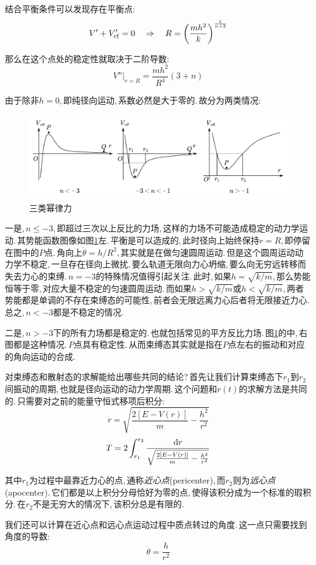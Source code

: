 结合平衡条件可以发现存在平衡点:
\[V'+V_{\rm cf}'=0\quad\Rightarrow \quad R=\left(\frac{mh^2}{k}\right)^{\frac{1}{n+3}}\]

那么在这个点处的稳定性就取决于二阶导数:
\[V''|_{r=R}=\frac{mh^2}{R^4}\left(3+n\right)\]

由于除非$h=0$,\,即纯径向运动,\,系数必然是大于零的.\,故分为两类情况:
\begin{figure}[H]
\centering
\includegraphics[width=16cm]{image/6-5-2.png}
\caption{三类幂律力}\label{6-5-2}
\end{figure}


一是,\,$n\leq -3$,\,即超过三次以上反比的力场,\,这样的力场不可能造成稳定的动力学运动.\,其势能函数图像如图\ref{6-5-2}左.\,平衡是可以造成的,\,此时径向上始终保持$r=R$,\,即停留在图中的$P$点.\,角向上$\dot{\theta}=h/R^2$,\,其实就是在做匀速圆周运动.\,但是这个圆周运动动力学不稳定,\,一旦存在径向上微扰,\,要么轨道无限向力心坍缩,\,要么向无穷远转移而失去力心的束缚.\,$n=-3$的特殊情况值得引起关注.\,此时,\,如果$h=\sqrt{k/m}$,\,那么势能恒等于零,\,对应大量不稳定的匀速圆周运动.\,而如果$h>\sqrt{k/m}$或$h<\sqrt{k/m}$,\,两者势能都是单调的不存在束缚态的可能性,\,前者会无限远离力心后者将无限接近力心.\,总之,\,$n<-3$都是不稳定的情况.

二是,\,$n>-3$下的所有力场都是稳定的.\,也就包括常见的平方反比力场.\,图\ref{6-5-2}的中,\,右图都是这种情况.\,$P$点具有稳定性.\,从而束缚态其实就是指在$P$点左右的振动和对应的角向运动的合成.

对束缚态和散射态的求解能给出哪些共同的结论?\,首先让我们计算束缚态下$r_1$到$r_2$间振动的周期,\,也就是径向运动的动力学周期.\,这个问题和$r(t)$的求解方法是共同的.\,只需要对之前的能量守恒式移项后积分:
\[\dot{r}=\sqrt{\frac{2[E-V(r)]}{m}-\frac{h^2}{r^2}}\]
\[T=2\int_{r_1}^{r_2}\frac{\textrm{d} r}{\sqrt{\frac{2[E-V(r)]}{m}-\frac{h^2}{r^2}}}\]

其中$r_1$为过程中最靠近力心的点,\,通称\emph{近心点}(pericenter),\,而$r_2$则为\emph{远心点}(apocenter).\,它们都是以上积分分母恰好为零的点,\,使得该积分成为一个标准的瑕积分.\,在$r_2$不是无穷大的情况下,\,该积分总是有限的.

我们还可以计算在近心点和远心点运动过程中质点转过的角度.\,这一点只需要找到角度的导数:
\[\dot{\theta}=\frac{h}{r^2}\]

